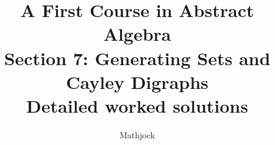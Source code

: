 
\title{\textbf{A First Course in Abstract Algebra}\\[0.3em]Section 7: Generating Sets and Cayley Digraphs\\[0.3em]\large Detailed worked solutions}
\author{Mathjock}
\date{}

\maketitle
\bookinfo
\tableofcontents
\clearpage
\renewcommand{\thesection}{7}
\renewcommand{\theHsection}{fraleigh.7}


